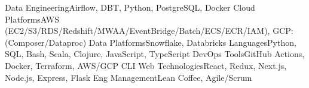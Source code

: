 \begin{additionals}
  \addional
    {Data Engineering}{Airflow, DBT, Python, PostgreSQL, Docker}
  \addional
    {Cloud Platforms}{AWS (EC2/S3/RDS/Redshift/MWAA/EventBridge/Batch/ECS/ECR/IAM), GCP: (Composer/Dataproc)}
  \addional
    {Data Platforms}{Snowflake, Databricks}
  \addional
    {Languages}{Python, SQL, Bash, Scala, Clojure, JavaScript, TypeScript}
  \addional
    {DevOps Tools}{GitHub Actions, Docker, Terraform, AWS/GCP CLI}
  \addional
    {Web Technologies}{React, Redux, Next.js, Node.js, Express, Flask}
  \addional
    {Eng Management}{Lean Coffee, Agile/Scrum}
\end{additionals}